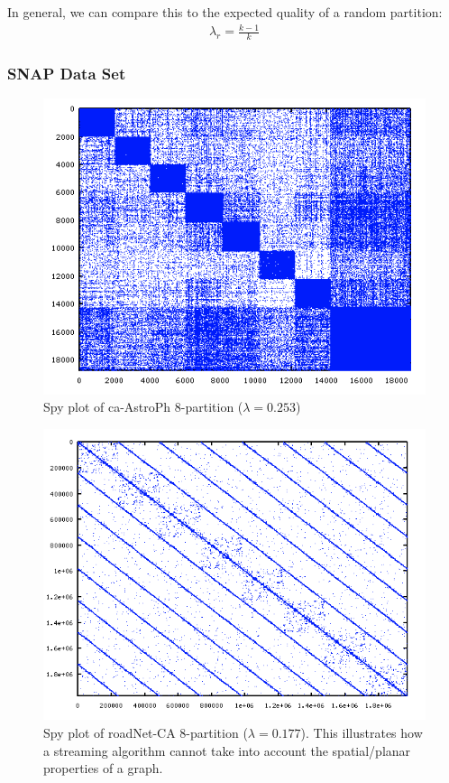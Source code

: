 \documentclass[11pt]{article}
\begin{document}
In general, we can compare this to the expected quality of a random partition:
\begin{align}\lambda_r = \frac{k-1}{k} \end{align}

\subsubsection{SNAP Data Set}

\begin{figure}[ht]
\centering
\includegraphics[scale=.70] {figures/astroPh8.png}
\caption[Caption for]{Spy plot of ca-AstroPh 8-partition ($\lambda=0.253$)}
\label{fig:3}
\end{figure}

\begin{figure}[ht]
\centering
\includegraphics[scale=.60] {figures/roadNet-CA8.png}
\caption[Caption for]{Spy plot of roadNet-CA 8-partition ($\lambda=0.177$). This illustrates how a streaming algorithm cannot take into account the spatial/planar properties of a graph.}
\label{fig:4}
\end{figure}
\end{document}
